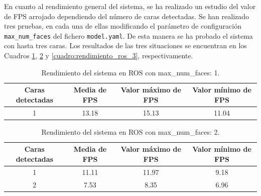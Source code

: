 En cuanto al rendimiento general del sistema, se ha realizado un estudio del valor de FPS arrojado dependiendo del número de caras detectadas. Se han realizado tres pruebas, en cada una de ellas modificando el parámetro de configuración \verb|max_num_faces| del fichero \verb|model.yaml|. De esta manera se ha probado el sistema con hasta tres caras. Los resultados de las tres situaciones se encuentran en los Cuadros \ref{cuadro:rendimiento_ros_1}, \ref{cuadro:rendimiento_ros_2} y \ref{cuadro:rendimiento_ros_3}, respectivamente.\\

\begin{table}[H]
\begin{center}
\begin{adjustbox}{max width=\textwidth}
\begin{tabular}{|c|c|c|c|}
     \hline
    \textbf{Caras detectadas} & \textbf{Media de FPS} & \textbf{Valor máximo de FPS} & \textbf{Valor mínimo de FPS}\\
    \hline
     1 & 13.18 & 15.13 & 11.04\\
     \hline
 \end{tabular}
 \end{adjustbox}
 \captionsetup{justification=centering}
\caption{Rendimiento del sistema en ROS con max\_num\_faces: 1.}
\label{cuadro:rendimiento_ros_1}
\end{center}
\end{table}

\begin{table}[H]
\begin{center}
\begin{adjustbox}{max width=\textwidth}
\begin{tabular}{|c|c|c|c|}
     \hline
    \textbf{Caras detectadas} & \textbf{Media de FPS} & \textbf{Valor máximo de FPS} & \textbf{Valor mínimo de FPS}\\
    \hline
     1 & 11.11 & 11.97 & 9.18\\
     2 & 7.53 & 8.35 & 6.96\\
     \hline
 \end{tabular}
 \end{adjustbox}
 \captionsetup{justification=centering}
\caption{Rendimiento del sistema en ROS con max\_num\_faces: 2.}
\label{cuadro:rendimiento_ros_2}
\end{center}
\end{table}

